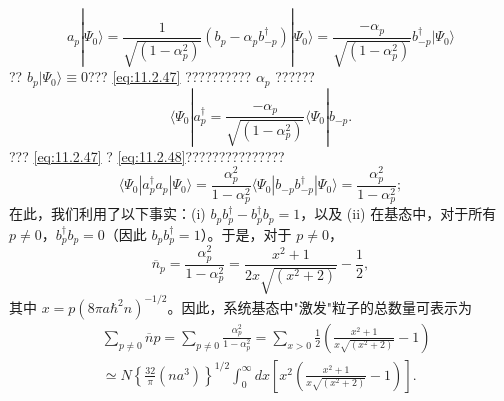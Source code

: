 \begin{equation}\tag{11.2.47}\label{eq:11.2.47}
a _ { p } | \Psi _ { 0 } \rangle = \frac { 1 } { \sqrt { ( 1 - \alpha _ { p } ^{2} ) } } ( b _ { p } - \alpha _ { p } b _ { - p } ^{\dagger} ) | \Psi _ { 0 } \rangle = \frac { - \alpha _ { p } } { \sqrt { ( 1 - \alpha _ { p } ^{2} ) } } b _ { - p } ^{\dagger} | \Psi _ { 0 } \rangle
\end{equation}
?? \(b_{p}|\Psi_{0}\rangle\equiv0\)??? \autoref{eq:11.2.47} ?????????? \(\alpha_{p}\) ??????
\begin{equation}\tag{11.2.48}\label{eq:11.2.48}
\langle \Psi _ { 0 } | a _ { p } ^{\dagger} = \frac { - \alpha _ { p } } { \sqrt { ( 1 - \alpha _ { p } ^{2} ) } } \langle \Psi _ { 0 } | b _ { - p } .
\end{equation}
??? \autoref{eq:11.2.47} ? \autoref{eq:11.2.48}???????????????
\begin{equation}\tag{11.2.49}\label{eq:11.2.49}
\langle \Psi _ { 0 } | a _ { p } ^{\dagger} a _ { p } | \Psi _ { 0 } \rangle = \frac { \alpha _ { p } ^{2} } { 1 - \alpha _ { p } ^{2} } \langle \Psi _ { 0 } | b _ { - p } b _ { - p } ^{\dagger} | \Psi _ { 0 } \rangle = \frac { \alpha _ { p } ^{2} } { 1 - \alpha _ { p } ^{2} } ;
\end{equation}
在此，我们利用了以下事实：(i) \(b_{p}b_{p}^{\dagger}-b_{p}^{\dagger}b_{p}=1\)，以及 (ii) 在基态中，对于所有 \(p\neq0\)，\(b_{p}^{\dagger}b_{p}=0\)（因此 \(b_{p}b_{p}^{\dagger}=1\)）。于是，对于 \(p\neq0\)，
\begin{equation}\tag{11.2.50}\label{eq:11.2.50}
\overline { { n } } _ { p } = \frac { \alpha _ { p } ^{2} } { 1 - \alpha _ { p } ^{2} } = \frac { x ^{2} + 1 } { 2 x \sqrt { ( x ^{2} + 2 ) } } - \frac { 1 } { 2 } ,
\end{equation}
其中 \(x=p(8\pi a\hbar^2n)^{-1/2}\)。因此，系统基态中"激发"粒子的总数量可表示为
\begin{equation}\tag{11.2.51}\label{eq:11.2.51}
\begin{array}{rl} & { \sum _ { p \neq 0 } \overline { { n } } p = \sum _ { p \neq 0 } \frac { \alpha _ { p } ^{2} } { 1 - \alpha _ { p } ^{2} } = \sum _ { x > 0 } \frac { 1 } { 2 } \left( \frac { x ^{2} + 1 } { x \sqrt { ( x ^{2} + 2 ) } } - 1 \right) } \\& { \simeq N \left\{ \frac { 32 } { \pi } ( n a ^{3} ) \right\} ^{1 / 2} \int _ { 0 } ^{\infty} d x \left[ x ^{2} \left( \frac { x ^{2} + 1 } { x \sqrt { ( x ^{2} + 2 ) } } - 1 \right) \right] . } \end{array}
\end{equation}
